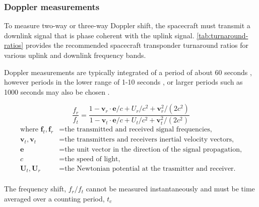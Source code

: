 \subsubsection{Doppler measurements}

To measure two-way or three-way Doppler shift, the spacecraft must transmit a
downlink signal that is phase coherent with the uplink signal.
\autoref{tab:turnaround-ratios} provides the recommended spacecraft transponder
turnaround ratios for various uplink and downlink frequency bands.

Doppler measurements are typically integrated of a period of about 60 seconds
\cite{}, however periods in the lower range of 1-10 seconds \cite{}, or larger
periods such as 1000 seconds may also be chosen \cite{}.


\cite{Soffel1989}

\begin{equation}
    \frac{f_r}{f_t} = \frac{
        1-\mathbf{v}_r\cdot{}\mathbf{e}/c + U_r/c^2 +\mathbf{v}_r^2/(2c^2)
    }{
        1-\mathbf{v}_t\cdot{}\mathbf{e}/c + U_t/c^2 +\mathbf{v}_t^2/(2c^2)
    }
\end{equation}
\begin{equation*}
    \begin{aligned}
        \textrm{where  }
        \mathbf{f}_t, \mathbf{f}_r & = \textrm{the transmitted and received signal frequencies,}            \\
        \mathbf{v}_t, \mathbf{v}_t & = \textrm{the transmitters and receivers inertial velocity vectors,}   \\
        \mathbf{e}                 & = \textrm{the unit vector in the direction of the signal propagation,} \\
        c                          & = \textrm{the speed of light,}                                         \\
        \mathbf{U}_t, \mathbf{U}_r & = \textrm{the Newtonian potential at the trasmitter and receiver.}     \\
    \end{aligned}
\end{equation*}

The frequency shift, $f_r/f_t$ cannot be measured instantaneously and must be
time averaged over a counting period, $t_c$


